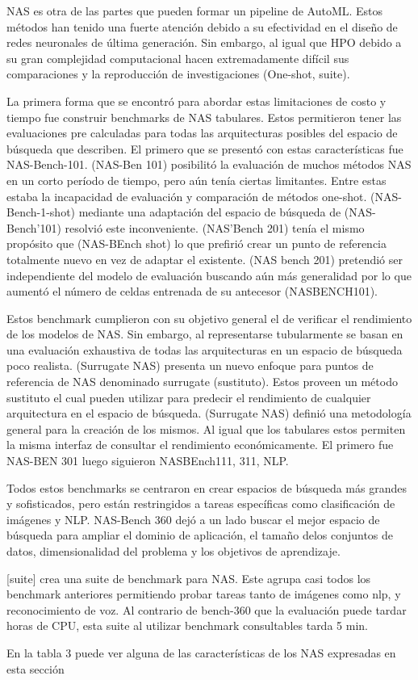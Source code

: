 NAS es otra de las partes que pueden formar un pipeline de AutoML. Estos métodos han tenido una fuerte atención debido a su efectividad en el diseño de redes neuronales 
de última generación. Sin embargo, al igual que HPO debido a su gran complejidad computacional hacen extremadamente difícil sus comparaciones y la reproducción de 
investigaciones (One-shot, suite).

La primera forma que se encontró para abordar estas limitaciones de costo y tiempo fue construir benchmarks de NAS tabulares. Estos permitieron tener las evaluaciones 
pre calculadas para todas las arquitecturas posibles del espacio de búsqueda que describen. El primero que se presentó con estas características fue NAS-Bench-101. 
(NAS-Ben 101) posibilitó la evaluación de muchos métodos NAS en un corto período de tiempo, pero aún tenía ciertas limitantes. Entre estas estaba la incapacidad de 
evaluación y comparación de métodos one-shot. (NAS-Bench-1-shot) mediante una adaptación del espacio de búsqueda de (NAS-Bench’101) resolvió este inconveniente. 
(NAS’Bench 201) tenía el mismo propósito que (NAS-BEnch shot) lo que prefirió crear un punto de referencia totalmente nuevo en vez de adaptar el existente. 
(NAS bench 201) pretendió ser independiente del modelo de evaluación buscando aún más generalidad por lo que aumentó el número de celdas entrenada de su antecesor 
(NASBENCH101).

Estos benchmark cumplieron con su objetivo general el de verificar el rendimiento de los modelos de NAS. Sin embargo, al representarse tubularmente se basan en una 
evaluación exhaustiva de todas las arquitecturas en un espacio de búsqueda poco realista. (Surrugate NAS) presenta un nuevo enfoque para puntos de referencia de NAS 
denominado surrugate (sustituto). Estos proveen un método sustituto el cual pueden utilizar para predecir el rendimiento de cualquier arquitectura en el espacio de 
búsqueda. (Surrugate NAS) definió una metodología general para la creación de los mismos. Al igual que los tabulares estos permiten la misma interfaz de consultar el 
rendimiento económicamente. El primero fue NAS-BEN 301 luego siguieron NASBEnch111, 311, NLP.

Todos estos benchmarks se centraron en crear espacios de búsqueda más grandes y sofisticados, pero están restringidos a tareas específicas como clasificación de imágenes 
y NLP. NAS-Bench 360 dejó a un lado buscar el mejor espacio de búsqueda para ampliar el dominio de aplicación, el tamaño delos conjuntos de datos, dimensionalidad del 
problema y los objetivos de aprendizaje.

[suite] crea una suite de benchmark para NAS. Este agrupa casi todos los benchmark anteriores permitiendo probar tareas tanto de imágenes como nlp, y reconocimiento de 
voz. Al contrario de bench-360 que la evaluación puede tardar horas de CPU, esta suite al utilizar benchmark consultables tarda 5 min.

En la tabla 3 puede ver alguna de las características de los NAS expresadas en esta sección



